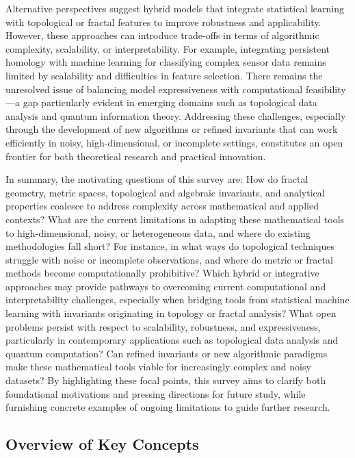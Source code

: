 \documentclass[sigconf]{acmart}
\begin{document}
Alternative perspectives suggest hybrid models that integrate statistical learning with topological or fractal features to improve robustness and applicability. However, these approaches can introduce trade-offs in terms of algorithmic complexity, scalability, or interpretability. For example, integrating persistent homology with machine learning for classifying complex sensor data remains limited by scalability and difficulties in feature selection. There remains the unresolved issue of balancing model expressiveness with computational feasibility—a gap particularly evident in emerging domains such as topological data analysis and quantum information theory. Addressing these challenges, especially through the development of new algorithms or refined invariants that can work efficiently in noisy, high-dimensional, or incomplete settings, constitutes an open frontier for both theoretical research and practical innovation.

In summary, the motivating questions of this survey are:
How do fractal geometry, metric spaces, topological and algebraic invariants, and analytical properties coalesce to address complexity across mathematical and applied contexts?
What are the current limitations in adapting these mathematical tools to high-dimensional, noisy, or heterogeneous data, and where do existing methodologies fall short? For instance, in what ways do topological techniques struggle with noise or incomplete observations, and where do metric or fractal methods become computationally prohibitive?
Which hybrid or integrative approaches may provide pathways to overcoming current computational and interpretability challenges, especially when bridging tools from statistical machine learning with invariants originating in topology or fractal analysis?
What open problems persist with respect to scalability, robustness, and expressiveness, particularly in contemporary applications such as topological data analysis and quantum computation? Can refined invariants or new algorithmic paradigms make these mathematical tools viable for increasingly complex and noisy datasets?
By highlighting these focal points, this survey aims to clarify both foundational motivations and pressing directions for future study, while furnishing concrete examples of ongoing limitations to guide further research.

\subsection{Overview of Key Concepts}
\end{document}
